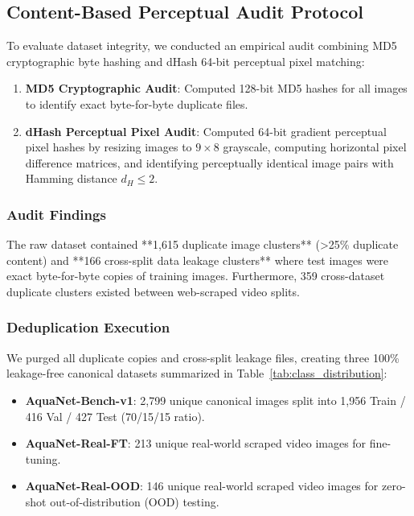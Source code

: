 \documentclass[journal]{IEEEtran}
\newcommand{\datasetbench}{AquaNet-Bench-v1}
\newcommand{\datasetrealft}{AquaNet-Real-FT}
\newcommand{\datasetrealood}{AquaNet-Real-OOD}
\begin{document}
\subsection{Content-Based Perceptual Audit Protocol}
To evaluate dataset integrity, we conducted an empirical audit combining MD5 cryptographic byte hashing and dHash 64-bit perceptual pixel matching:
\begin{enumerate}
    \item \textbf{MD5 Cryptographic Audit}: Computed 128-bit MD5 hashes for all images to identify exact byte-for-byte duplicate files.
    \item \textbf{dHash Perceptual Pixel Audit}: Computed 64-bit gradient perceptual pixel hashes by resizing images to $9 \times 8$ grayscale, computing horizontal pixel difference matrices, and identifying perceptually identical image pairs with Hamming distance $d_H \le 2$.
\end{enumerate}

\subsubsection{Audit Findings}
The raw dataset contained **1,615 duplicate image clusters** (>25\% duplicate content) and **166 cross-split data leakage clusters** where test images were exact byte-for-byte copies of training images. Furthermore, 359 cross-dataset duplicate clusters existed between web-scraped video splits.

\subsubsection{Deduplication Execution}
We purged all duplicate copies and cross-split leakage files, creating three 100\% leakage-free canonical datasets summarized in Table~\ref{tab:class_distribution}:
\begin{itemize}
    \item \textbf{\datasetbench{}}: 2,799 unique canonical images split into 1,956 Train / 416 Val / 427 Test (70/15/15 ratio).
    \item \textbf{\datasetrealft{}}: 213 unique real-world scraped video images for fine-tuning.
    \item \textbf{\datasetrealood{}}: 146 unique real-world scraped video images for zero-shot out-of-distribution (OOD) testing.
\end{itemize}
\end{document}
